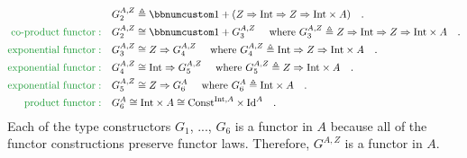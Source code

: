 \begin{align*}
 & G_{2}^{A,Z}\triangleq\bbnum 1+(Z\Rightarrow\text{Int}\Rightarrow Z\Rightarrow\text{Int}\times A)\quad.\\
{\color{greenunder}\text{co-product functor}:}\quad & G_{2}^{A,Z}\cong\bbnum 1+G_{3}^{A,Z}\quad\text{ where }G_{3}^{A,Z}\triangleq Z\Rightarrow\text{Int}\Rightarrow Z\Rightarrow\text{Int}\times A\quad.\\
{\color{greenunder}\text{exponential functor}:}\quad & G_{3}^{A,Z}\cong Z\Rightarrow G_{4}^{A,Z}\quad\text{ where }G_{4}^{A,Z}\triangleq\text{Int}\Rightarrow Z\Rightarrow\text{Int}\times A\quad.\\
{\color{greenunder}\text{exponential functor}:}\quad & G_{4}^{A,Z}\cong\text{Int}\Rightarrow G_{5}^{A,Z}\quad\text{ where }G_{5}^{A,Z}\triangleq Z\Rightarrow\text{Int}\times A\quad.\\
{\color{greenunder}\text{exponential functor}:}\quad & G_{5}^{A,Z}\cong Z\Rightarrow G_{6}^{A}\quad\text{ where }G_{6}^{A}\triangleq\text{Int}\times A\quad.\\
{\color{greenunder}\text{product functor}:}\quad & G_{6}^{A}\cong\text{Int}\times A\cong\text{Const}^{\text{Int},A}\times\text{Id}^{A}\quad.
\end{align*}
Each of the type constructors $G_{1}$, ..., $G_{6}$ is a functor
in $A$ because all of the functor constructions preserve functor
laws. Therefore, $G^{A,Z}$ is a functor in $A$. 

